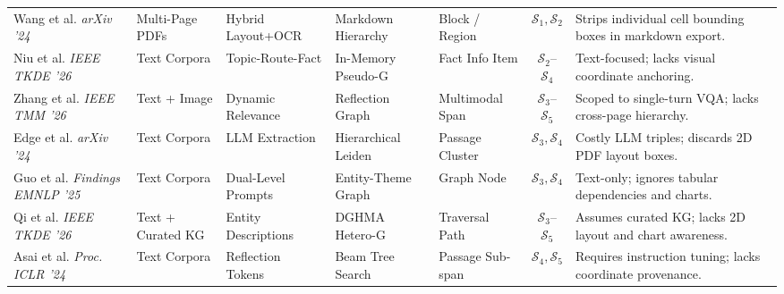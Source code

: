 \documentclass[conference,a4paper]{IEEEtran}
\begin{document}
\begin{table}[t]
\begin{tabularx}{\textwidth}{@{}p{2.1cm}p{1.7cm}p{2.0cm}p{2.1cm}p{1.6cm}c>{\raggedright\arraybackslash}X@{}}
\addlinespace[1.5pt]
Wang et al. \cite{wang2024mineru} \newline \emph{arXiv '24} & Multi-Page PDFs & Hybrid Layout+OCR & Markdown Hierarchy & Block / Region & $\mathcal{S}_1, \mathcal{S}_2$ & Strips individual cell bounding boxes in markdown export. \\
\addlinespace[1.5pt]
Niu et al. \cite{niu2026} \newline \emph{IEEE TKDE '26} & Text Corpora & Topic-Route-Fact & In-Memory Pseudo-G & Fact Info Item & $\mathcal{S}_2$--$\mathcal{S}_4$ & Text-focused; lacks visual coordinate anchoring. \\
\addlinespace[1.5pt]
Zhang et al. \cite{zhang2026m2ag} \newline \emph{IEEE TMM '26} & Text + Image & Dynamic Relevance & Reflection Graph & Multimodal Span & $\mathcal{S}_3$--$\mathcal{S}_5$ & Scoped to single-turn VQA; lacks cross-page hierarchy. \\
\addlinespace[1.5pt]
Edge et al. \cite{edge2024} \newline \emph{arXiv '24} & Text Corpora & LLM Extraction & Hierarchical Leiden & Passage Cluster & $\mathcal{S}_3, \mathcal{S}_4$ & Costly LLM triples; discards 2D PDF layout boxes. \\
\addlinespace[1.5pt]
Guo et al. \cite{guo2025lightrag} \newline \emph{Findings EMNLP '25} & Text Corpora & Dual-Level Prompts & Entity-Theme Graph & Graph Node & $\mathcal{S}_3, \mathcal{S}_4$ & Text-only; ignores tabular dependencies and charts. \\
\addlinespace[1.5pt]
Qi et al. \cite{qi2026} \newline \emph{IEEE TKDE '26} & Text + Curated KG & Entity Descriptions & DGHMA Hetero-G & Traversal Path & $\mathcal{S}_3$--$\mathcal{S}_5$ & Assumes curated KG; lacks 2D layout and chart awareness. \\
\addlinespace[1.5pt]
Asai et al. \cite{asai2024selfrag} \newline \emph{Proc. ICLR '24} & Text Corpora & Reflection Tokens & Beam Tree Search & Passage Sub-span & $\mathcal{S}_4, \mathcal{S}_5$ & Requires instruction tuning; lacks coordinate provenance. \\
\bottomrule
\end{tabularx}
\end{table}

\end{document}
